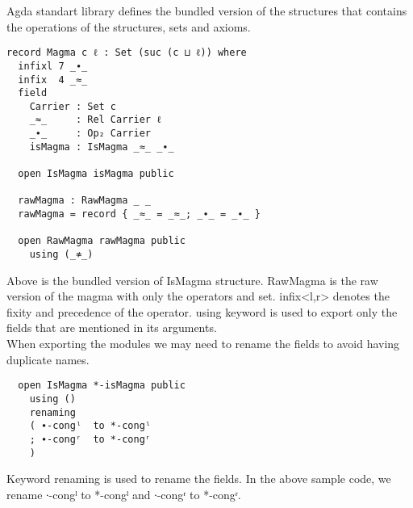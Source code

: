 Agda standart library defines the bundled version of the structures that contains the operations of the structures, sets and axioms. 
\begin{Verbatim}
record Magma c ℓ : Set (suc (c ⊔ ℓ)) where
  infixl 7 _∙_
  infix  4 _≈_
  field
    Carrier : Set c
    _≈_     : Rel Carrier ℓ
    _∙_     : Op₂ Carrier
    isMagma : IsMagma _≈_ _∙_

  open IsMagma isMagma public

  rawMagma : RawMagma _ _
  rawMagma = record { _≈_ = _≈_; _∙_ = _∙_ }

  open RawMagma rawMagma public
    using (_≉_)
\end{Verbatim}
Above is the bundled version of IsMagma structure. RawMagma is the raw version of the magma with only the operators and set. infix<l,r> denotes the fixity and precedence of the operator. using keyword is used to export only the fields that are mentioned in its arguments. \\
When exporting the modules we may need to rename the fields to avoid having duplicate names.
\begin{Verbatim}
  open IsMagma *-isMagma public
    using ()
    renaming
    ( ∙-congˡ  to *-congˡ
    ; ∙-congʳ  to *-congʳ
    )
\end{Verbatim} 
Keyword renaming is used to rename the fields. In the above sample code, we rename ∙-congˡ  to *-congˡ and ∙-congʳ  to *-congʳ.

